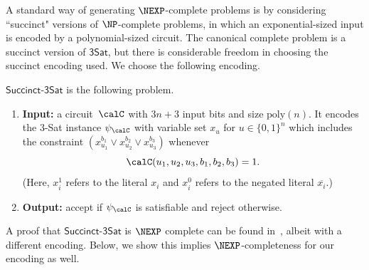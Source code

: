 \documentclass[11pt]{article}
\newcommand{\succinct}{\mathsf{Succinct}\text{-}\mathsf{3Sat}}
\begin{document}
A standard way of generating $\NEXP$-complete problems 
is by considering ``succinct" versions of $\NP$-complete problems,
in which an exponential-sized input is encoded by a polynomial-sized circuit.
The canonical complete problem is a succinct version of $\mathsf{3Sat}$,
but there is considerable freedom in choosing the succinct encoding used.
We choose the following encoding.

\begin{definition}
$\succinct$ is the following problem.
\begin{enumerate}
\item[$\circ$] \textbf{Input:} a circuit~$\calC$ with $3n+3$ input bits and size $\mathrm{poly}(n)$.
It encodes the 3-Sat instance $\psi_{\calC}$ with variable set $x_u$ for $u \in \{0, 1\}^n$
which includes the constraint $(x_{u_1}^{b_1} \lor x_{u_2}^{b_2}\lor x_{u_3}^{b_3})$ whenever
\begin{equation*}
\calC(u_1, u_2, u_3, b_1, b_2, b_3) = 1.
\end{equation*}
(Here, $x_i^1$ refers to the literal $x_i$ and $x_i^0$ refers to the negated literal $\overline{x_i}$.)
\item[$\circ$] \textbf{Output:} accept if $\psi_{\calC}$ is satisfiable and reject otherwise.
\end{enumerate}
\end{definition}

A proof that $\succinct$ is $\NEXP$ complete can be found in~\cite[Chapter 20]{Pap94},
albeit with a different encoding.
Below, we show this implies $\NEXP$-completeness for our encoding as well.
\end{document}
